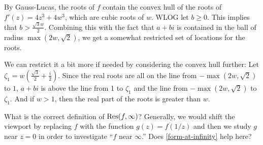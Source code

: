 \documentclass{homework}
\begin{document}
\begin{solution}
                                                                                                                         By Gauss-Lucas, the roots of $f$ contain the convex hull of the roots of $f'(z) = 4z^3+4w^3$, which are cubic roots of $w$. WLOG let $b\geq 0$. This implies that $b > \frac{\sqrt{3}w}{2}$. Combining this with the fact that $a+bi$ is contained in the ball of radius $\max(2w, \sqrt{2})$, we get a somewhat restricted set of locations for the roots.

                                                                                                                         We can restrict it a bit more if needed by considering the convex hull further: Let $\zeta_1 = w(\frac{\sqrt{3}}{2}+\frac{i}{2})$. Since the real roots are all on the line from $-\max(2w, \sqrt{2})$ to $1$, $a+bi$ is above the line from 1 to $\zeta_1$ and the line from $-\max(2w, \sqrt{2})$ to $\zeta_1$. And if $w>1$, then the real part of the roots is greater than $w.$ 
                                                                                                                         \end{solution}
                                                                                                                         \begin{problem}
                                                                                                                           What is the correct definition of $\operatorname{Res}(f,\infty)$?  Generally, we
                                                                                                                             would shift the viewport by replacing $f$ with the function
                                                                                                                               $g(z) = f(1/z)$ and then we study $g$ near $z = 0$ in order to
                                                                                                                                 investigate ``$f$ near $\infty$.''  Does \ref{form-at-infinity} help
                                                                                                                                   here?
                                                                                                                                   \end{problem}
\end{document}
